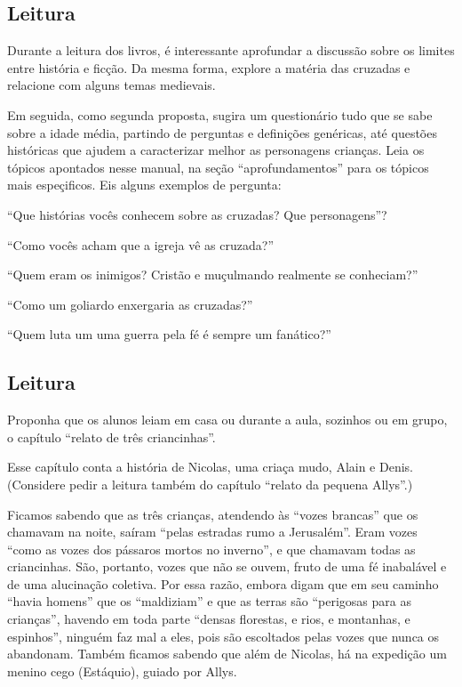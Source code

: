 \documentclass[12pt]{extarticle}
\begin{document}
\subsection{Leitura}

Durante a leitura dos livros, é interessante aprofundar a discussão sobre os limites entre
história e ficção. Da mesma forma, explore a matéria 
das cruzadas e relacione com alguns temas medievais.

 
Em seguida, como segunda proposta, sugira um questionário tudo que se sabe sobre 
a idade média, partindo de perguntas e definições genéricas, até questões históricas 
que ajudem a caracterizar melhor as personagens crianças. Leia os 
tópicos apontados nesse manual, na seção ``aprofundamentos'' para 
os tópicos mais espeçificos.  Eis alguns exemplos de pergunta:

``Que histórias vocês conhecem sobre as cruzadas? Que personagens''?

``Como vocês acham que a igreja vê as cruzada?''

``Quem eram os inimigos? Cristão e muçulmando realmente se conheciam?''

``Como um goliardo enxergaria as cruzadas?''

``Quem luta um uma guerra pela fé é sempre um fanático?'' 


\subsection{Leitura}

Proponha que os alunos leiam em casa ou durante a aula, sozinhos ou em grupo, 
o capítulo “relato de três criancinhas”.

Esse capítulo 
conta a história de Nicolas, uma criaça mudo, Alain e Denis. 
(Considere pedir a leitura também do capítulo “relato da pequena Allys”.) 
 
Ficamos sabendo que as três crianças, atendendo às “vozes brancas”
que os chamavam na noite, saíram “pelas estradas rumo a Jerusalém”.
Eram vozes “como as vozes dos pássaros mortos no inverno”, e que chamavam todas
as criancinhas. São, portanto, vozes que não se ouvem, fruto de uma fé
inabalável e de uma alucinação coletiva. Por essa razão, embora digam que em
seu caminho “havia homens” que os “maldiziam” e que as terras são “perigosas
para as crianças”, havendo em toda parte “densas florestas, e rios,
e montanhas, e espinhos”, ninguém faz mal a eles, pois são escoltados pelas
vozes que nunca os abandonam. Também ficamos sabendo que além de Nicolas, 
há na expedição um menino cego (Estáquio), guiado por Allys.
 
\end{document}
